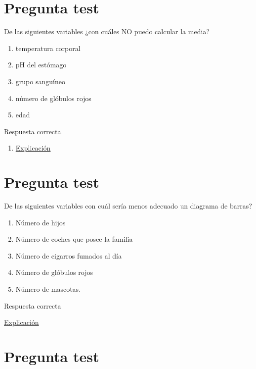 \documentclass[
]{book}
\providecommand{\tightlist}{%
  \setlength{\itemsep}{0pt}\setlength{\parskip}{0pt}}
\begin{document}
\hypertarget{pregunta-test-84}{%
\section{Pregunta test}\label{pregunta-test-84}}

De las siguientes variables ¿con cuáles NO puedo calcular la media?

\begin{enumerate}
\def\labelenumi{\alph{enumi})}
\tightlist
\item
  temperatura corporal
\item
  pH del estómago
\item
  grupo sanguíneo
\item
  número de glóbulos rojos
\item
  edad
\end{enumerate}

Respuesta correcta

\begin{enumerate}
\def\labelenumi{\alph{enumi})}
\setcounter{enumi}{2}
\tightlist
\item
  \href{https://1fjmanzano.github.io/bioestadistica/tipos-de-variables.html}{Explicación}
\end{enumerate}

\hypertarget{pregunta-test-85}{%
\section{Pregunta test}\label{pregunta-test-85}}

De las siguientes variables con cuál sería menos adecuado un diagrama de barras?

\begin{enumerate}
\def\labelenumi{\alph{enumi})}
\tightlist
\item
  Número de hijos
\item
  Número de coches que posee la familia
\item
  Número de cigarros fumados al día
\item
  Número de glóbulos rojos
\item
  Número de mascotas.
\end{enumerate}

Respuesta correcta

\href{https://1fjmanzano.github.io/bioestadistica/representaciones-gra\%CC\%81ficas.html}{Explicación}

\hypertarget{pregunta-test-86}{%
\section{Pregunta test}\label{pregunta-test-86}}
\end{document}

